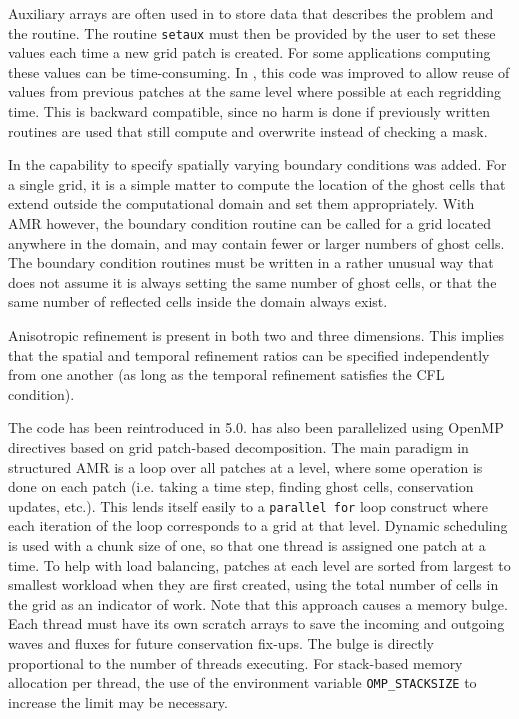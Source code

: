 Auxiliary arrays are often used in \clawpack to store data that 
describes the problem and the routine.
The routine \texttt{setaux} must then be provided by the user to set these values each time a
new grid patch is created.  For some applications computing these values can be time-consuming.  In ,
this code was improved to allow reuse of values from previous patches at
the same level where possible at each regridding time. 
This is backward compatible, since no harm is done if previously
written routines are used that still compute and overwrite instead of
checking a mask.  

In  the capability to specify spatially varying boundary conditions
was added. For a single grid, it is a simple matter to
compute the location of the ghost cells that extend
outside the computational domain and set them appropriately.
With AMR however, the boundary condition routine can be called
for a grid located anywhere in the domain, and may contain fewer
or larger numbers of ghost cells. The boundary condition routines
must be written in a rather unusual way that does not assume it
is always setting the same number of ghost cells, or that the
same number of reflected cells inside the domain always exist.

Anisotropic refinement is present in both two and three dimensions.  This implies that the spatial and temporal refinement ratios can be specified independently from one another (as long as the temporal refinement satisfies the CFL condition).

The  \amrclaw code has been
reintroduced in 5.0. \amrclaw has also been parallelized using OpenMP directives based on grid patch-based decomposition.
The main paradigm in structured AMR is a loop over
all patches at a level, where some operation is done on each patch
(i.e. taking a time step, finding ghost cells, conservation
updates, etc.).  This lends itself easily to a {\tt parallel for} loop
construct where each iteration of the loop corresponds to a
grid at that level. Dynamic scheduling is used with a chunk size
of one, so that one thread is assigned one patch at a time. 
To help with load balancing, patches at
each level are sorted from largest to smallest workload when they
are first created, using
the total number of cells in the grid as an indicator of work.
Note that this approach causes a memory bulge. Each thread
must have its own scratch arrays to save the incoming and
outgoing waves and fluxes for future conservation fix-ups. 
The bulge is directly proportional to the number
of threads executing. For stack-based memory allocation per
thread, the use of the environment variable 
{\tt OMP\_STACKSIZE} to increase the limit may be necessary.

